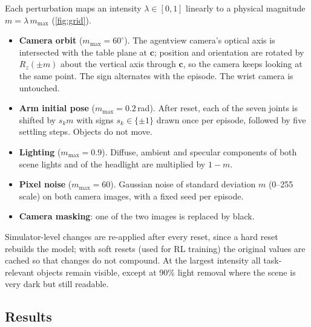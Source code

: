 \documentclass[10pt,twocolumn,letterpaper]{article}
\begin{document}
Each perturbation maps an intensity $\lambda\in[0,1]$ linearly to a physical magnitude $m=\lambda\,m_{\max}$
(\cref{fig:grid}).
\begin{itemize}
  \item \textbf{Camera orbit} ($m_{\max}=60^\circ$). The agentview camera's optical axis is intersected
  with the table plane at $\bm c$; position and orientation are rotated by $R_z(\pm m)$ about the vertical
  axis through $\bm c$, so the camera keeps looking at the same point. The sign alternates with the episode.
  The wrist camera is untouched.
  \item \textbf{Arm initial pose} ($m_{\max}=0.2$\,rad). After reset, each of the seven joints is shifted by
  $s_k m$ with signs $s_k\in\{\pm1\}$ drawn once per episode, followed by five settling steps. Objects do not
  move.
  \item \textbf{Lighting} ($m_{\max}=0.9$). Diffuse, ambient and specular components of both scene lights
  and of the headlight are multiplied by $1-m$.
  \item \textbf{Pixel noise} ($m_{\max}=60$). Gaussian noise of standard deviation $m$ (0--255 scale) on both
  camera images, with a fixed seed per episode.
  \item \textbf{Camera masking}: one of the two images is replaced by black.
\end{itemize}
Simulator-level changes are re-applied after every reset, since a hard reset rebuilds the model; with soft
resets (used for RL training) the original values are cached so that changes do not compound. At the
largest intensity all task-relevant objects remain visible, except at 90\% light removal where the scene is
very dark but still readable.



\subsection{Results}


\begin{table}[t]
\centering
\caption{\textbf{Breaking points}, with 95\% task-bootstrap intervals. Levels include the unperturbed one.}
\label{tab:bp}
\scriptsize
\setlength{\tabcolsep}{3pt}
\resizebox{\columnwidth}{!}{}
\end{table}
\end{document}
